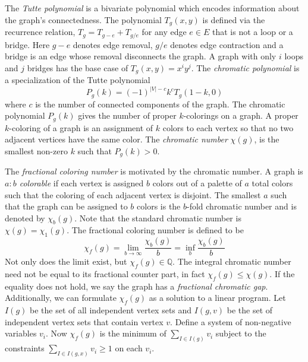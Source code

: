 \documentclass[12pt]{article}
\newcommand{\VARchromatic}{\chi}
\newcommand{\VARchromaticpolynomial}[1]{P_g(#1)}
\newcommand{\VARfractionalchromaticnumber}[1]{\VARchromatic_{#1}(g)}
\newcommand{\VARchromaticnumber}{\VARchromatic(g)}
\begin{document}
\begin{appendices}
The \textit{Tutte polynomial} is a bivariate polynomial which encodes information about the graph's connectedness.
The polynomial $T_g(x,y)$ is defined via the recurrence relation, $T_g = T_{g-e} + T_{g/e}$ for any edge $e \in E$ that is not a loop or a bridge. 
Here $g-e$ denotes edge removal, $g / e$ denotes edge contraction and a bridge is an edge whose removal disconnects the graph.
A graph with only $i$ loops and $j$ bridges has the base case of $T_g(x,y) = x^i y^j$.
%
The \textit{chromatic polynomial} is a specialization of the Tutte polynomial 
\begin{equation}
\VARchromaticpolynomial{k} = (-1)^{|V|-c}k^{c}T_g(1-k,0)
\end{equation}
where $c$ is the number of connected components of the graph.
The chromatic polynomial $\VARchromaticpolynomial{k}$ gives the number of proper $k$-colorings on a graph. 
A proper $k$-coloring of a graph is an assignment of $k$ colors to each vertex so that no two adjacent vertices have the same color. 
The \textit{chromatic number} $\VARchromaticnumber$, is the smallest non-zero $k$ such that $\VARchromaticpolynomial{k}>0$.

The \textit{fractional coloring number} is motivated by the chromatic number.
A graph is \textit{$a:b$ colorable} if each vertex is assigned $b$ colors out of a palette of $a$ total colors such that the coloring of each adjacent vertex is disjoint. 
The smallest $a$ such that the graph can be assigned to $b$ colors is the $b$-fold chromatic number and is denoted by $\VARfractionalchromaticnumber{b}$. 
Note that the standard chromatic number is $\VARchromaticnumber{} = \VARfractionalchromaticnumber{1}$.
The fractional coloring number is defined to be
\begin{equation}
\VARfractionalchromaticnumber{f} = 
\lim_{b \rightarrow \infty} \frac{\VARfractionalchromaticnumber{b}}{b} = 
\inf _ {b} \frac{\VARfractionalchromaticnumber{b}}{b} 
\end{equation}
Not only does the limit exist, but $\VARfractionalchromaticnumber{f} \in \mathbb{Q}$\cite{scheinerman2011fractional}.
The integral chromatic number need not be equal to its fractional counter part, in fact 
$\VARfractionalchromaticnumber{f} \le \VARchromaticnumber$.
If the equality does not hold, we say the graph has a \textit{fractional chromatic gap}.
Additionally, we can formulate $\VARfractionalchromaticnumber{f}$ as a solution to a linear program.
Let $I(g)$ be the set of all independent vertex sets and $I(g,v)$ be the set of independent vertex sets that contain vertex $v$. 
Define a system of non-negative variables $v_i$.
Now $\VARfractionalchromaticnumber{f}$ is the minimum of $\sum_{I \in I(g)} v_i$ subject to the constraints $\sum_{I \in I(g,x)} v_i \ge 1$ on each $v_i$.


\end{appendices}
\end{document}
